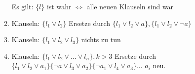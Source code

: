 \begin{description}
\begin{description}
\begin{itemize}
\begin{enumerate}
        \par Es gilt: $\{l\}$ ist wahr $\Leftrightarrow$ alle neuen Klauseln sind war
        \item Klauseln: $\{l_1 \lor l_2\}$ Ersetze durch $\{l_1 \lor l_2 \lor a\}, \{l_1 \lor l_2 \lor \neg a\}$
        \item Klauseln: $\{l_1 \lor l_2 \lor l_3\}$ nichts zu tun
        \item Klauseln: $\{l_1 \lor l_2 \lor ... \lor l_n\}, k > 3$ Ersetze durch $\{l_1 \lor l_2 \lor a_1\}\{\neg a \lor l_3 \lor a_2\}\{\neg a_1 \lor l_4 \lor a_3\}...$ $a_i$ neu.
       \end{enumerate}
      \end{itemize}
     \end{description}

\end{description}






